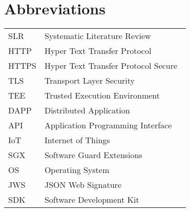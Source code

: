 \chapter*{Abbreviations}

\begin{flushleft}
\begin{tabular}{l p{0.8\linewidth}}
SLR      & Systematic Literature Review\\
HTTP     & Hyper Text Transfer Protocol\\
HTTPS    & Hyper Text Transfer Protocol Secure\\
TLS      & Transport Layer Security\\
TEE      & Trusted Execution Environment\\
DAPP     & Distributed Application\\
API      & Application Programming Interface\\
IoT      & Internet of Things\\
SGX      & Software Guard Extensions\\
OS       & Operating System\\
JWS      & JSON Web Signature\\
SDK      & Software Development Kit
\end{tabular}
\end{flushleft}

